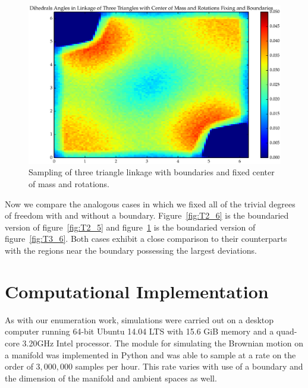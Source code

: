 \begin{figure}[ht]
\centering
  \includegraphics[scale=0.6]{images/T3_7_2D.eps}
\caption{Sampling of three triangle linkage with boundaries and fixed center of mass and rotations.}
\label{fig:T3_7}
\end{figure}


Now we compare the analogous cases in which we fixed all of the trivial degrees of freedom with and without a boundary. Figure~\ref{fig:T2_6} is the boundaried version of figure~\ref{fig:T2_5} and figure~\ref{fig:T3_7} is the boundaried version of figure~\ref{fig:T3_6}. Both cases exhibit a close comparison to their counterparts with the regions near the boundary possessing the largest deviations. 

\section{Computational Implementation}

As with our enumeration work, simulations were carried out on a desktop computer running 64-bit Ubuntu 14.04 LTS with 15.6 GiB memory and a quad-core 3.20GHz Intel processor. The module for simulating the Brownian motion on a manifold was implemented in Python and was able to sample at a rate on the order of $3,000,000$ samples per hour. This rate varies with use of a boundary and the dimension of the manifold and ambient spaces as well. 

